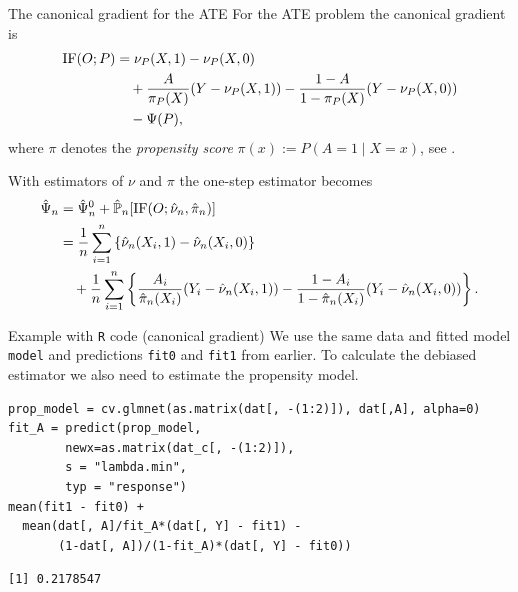 \documentclass[smaller]{beamer}\usepackage{listings}
\begin{document}
\begin{frame}[label={sec:org58b561d}]{The canonical gradient for the ATE}
\small For the ATE problem the canonical gradient is
\begin{align*}
  \mathrm{IF}(O; P)
  & = \nu_P(X, 1) - \nu_P(X, 0)
  \\
  & \quad
    + \frac{A}{\pi_P(X)}(Y - \nu_P(X, 1))
    - \frac{1-A}{1-\pi_P(X)}(Y - \nu_P(X, 0))
  \\
  & \quad
    - \Psi(P),
\end{align*}
where \(\pi\) denotes the \textit{propensity score} \(\pi(x) := P(A=1 \mid X=x)\), see
\cite{kennedy2022semiparametric,kennedy2016semiparametric}.

\vfill

With estimators of \(\nu\) and \(\pi\) the one-step estimator becomes
\begin{align*}
  \hat{\Psi}_n
  &  = \hat{\Psi}^0_n + \hat{\mathbb{P}}_n[\mathrm{IF}(O; \hat{\nu}_n, \hat{\pi}_n)]
  \\
  & = \frac{1}{n}\sum_{i=1}^{n}
    \left\{
    \hat\nu_n(X_i, 1) - \hat\nu_n(X_i, 0)
    \right\}
  \\
  & \quad
    +\frac{1}{n}\sum_{i=1}^{n}
    \left\{
    \frac{A_i}{\hat\pi_n(X_i)}(Y_i - \hat\nu_n(X_i, 1))
    - \frac{1-A_i}{1-\hat\pi_n(X_i)}(Y_i - \hat\nu_n(X_i, 0))    
    \right\}.
\end{align*}
\end{frame}

\begin{frame}[label={sec:org42ca5f8},fragile]{Example with \texttt{R} code (canonical gradient)}
 We use the same data and fitted model \texttt{model} and predictions \texttt{fit0} and \texttt{fit1} from earlier. To
calculate the debiased estimator we also need to estimate the propensity model.
\lstset{language=r,label= ,caption= ,captionpos=b,numbers=none}
\begin{lstlisting}
prop_model = cv.glmnet(as.matrix(dat[, -(1:2)]), dat[,A], alpha=0)
fit_A = predict(prop_model,
		newx=as.matrix(dat_c[, -(1:2)]),
		s = "lambda.min",
		typ = "response")
mean(fit1 - fit0) + 
  mean(dat[, A]/fit_A*(dat[, Y] - fit1) -
       (1-dat[, A])/(1-fit_A)*(dat[, Y] - fit0))
\end{lstlisting}

\begin{verbatim}
[1] 0.2178547
\end{verbatim}
\end{frame}
\end{document}

